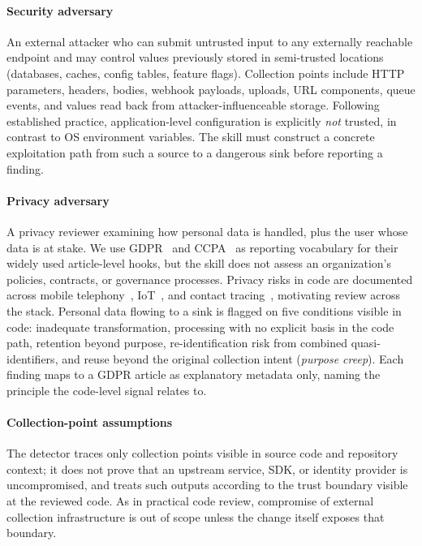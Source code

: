\documentclass[runningheads]{llncs}
\begin{document}
\paragraph{Security adversary} An external attacker who can submit untrusted input to any externally reachable endpoint and may control values previously stored in semi-trusted locations (databases, caches, config tables, feature flags). Collection points include HTTP parameters, headers, bodies, webhook payloads, uploads, URL components, queue events, and values read back from attacker-influenceable storage. Following established practice, application-level configuration is explicitly \emph{not} trusted, in contrast to OS environment variables. The skill must construct a concrete exploitation path from such a source to a dangerous sink before reporting a finding.

\paragraph{Privacy adversary} A privacy reviewer examining how personal data is handled, plus the user whose data is at stake. We use GDPR~\cite{gdpr2016} and CCPA~\cite{ccpa2018} as reporting vocabulary for their widely used article-level hooks, but the skill does not assess an organization's policies, contracts, or governance processes. Privacy risks in code are documented across mobile telephony~\cite{deng2018ceive}, IoT~\cite{wang2020zigbee,ferrara2020static}, and contact tracing~\cite{cicala2021pure}, motivating review across the stack. Personal data flowing to a sink is flagged on five conditions visible in code: inadequate transformation, processing with no explicit basis in the code path, retention beyond purpose, re-identification risk from combined quasi-identifiers, and reuse beyond the original collection intent (\emph{purpose creep}). Each finding maps to a GDPR article as explanatory metadata only, naming the principle the code-level signal relates to.

\paragraph{Collection-point assumptions} The detector traces only collection points visible in source code and repository context; it does not prove that an upstream service, SDK, or identity provider is uncompromised, and treats such outputs according to the trust boundary visible at the reviewed code. As in practical code review, compromise of external collection infrastructure is out of scope unless the change itself exposes that boundary.
\end{document}
